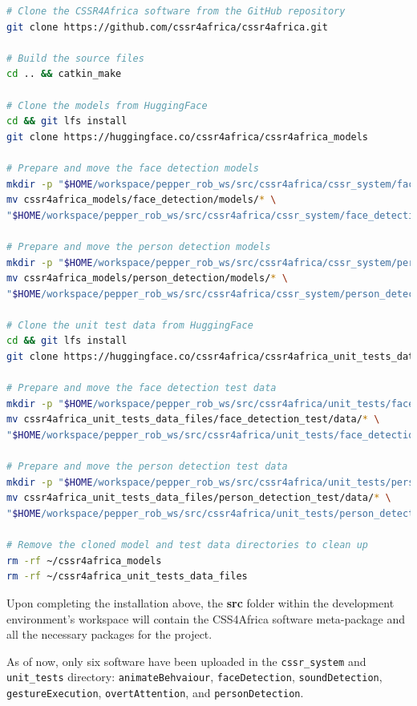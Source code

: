 \documentclass{CSSRforAfrica}
\begin{document}
{\begin{lstlisting}[style=withoutNumbering, language=bash]
# Clone the CSSR4Africa software from the GitHub repository
git clone https://github.com/cssr4africa/cssr4africa.git

# Build the source files
cd .. && catkin_make

# Clone the models from HuggingFace
cd && git lfs install
git clone https://huggingface.co/cssr4africa/cssr4africa_models

# Prepare and move the face detection models
mkdir -p "$HOME/workspace/pepper_rob_ws/src/cssr4africa/cssr_system/face_detection/models"
mv cssr4africa_models/face_detection/models/* \
"$HOME/workspace/pepper_rob_ws/src/cssr4africa/cssr_system/face_detection/models/"

# Prepare and move the person detection models
mkdir -p "$HOME/workspace/pepper_rob_ws/src/cssr4africa/cssr_system/person_detection/models"
mv cssr4africa_models/person_detection/models/* \
"$HOME/workspace/pepper_rob_ws/src/cssr4africa/cssr_system/person_detection/models/"

# Clone the unit test data from HuggingFace
cd && git lfs install
git clone https://huggingface.co/cssr4africa/cssr4africa_unit_tests_data_files

# Prepare and move the face detection test data
mkdir -p "$HOME/workspace/pepper_rob_ws/src/cssr4africa/unit_tests/face_detection_test/data"
mv cssr4africa_unit_tests_data_files/face_detection_test/data/* \
"$HOME/workspace/pepper_rob_ws/src/cssr4africa/unit_tests/face_detection_test/data/"

# Prepare and move the person detection test data
mkdir -p "$HOME/workspace/pepper_rob_ws/src/cssr4africa/unit_tests/person_detection_test/data"
mv cssr4africa_unit_tests_data_files/person_detection_test/data/* \
"$HOME/workspace/pepper_rob_ws/src/cssr4africa/unit_tests/person_detection_test/data/"

# Remove the cloned model and test data directories to clean up
rm -rf ~/cssr4africa_models
rm -rf ~/cssr4africa_unit_tests_data_files
\end{lstlisting}

\noindent Upon completing the installation above, the \textbf{src} folder within the development environment's workspace will contain the CSS4Africa software meta-package and all the necessary packages for the project. 

\newpage

As of now, only six software have been uploaded in the \texttt{cssr\_system} and \texttt{unit\_tests} directory: \texttt{animateBehvaiour}, \texttt{faceDetection}, \texttt{soundDetection}, \texttt{gestureExecution}, \texttt{overtAttention}, $ $and \texttt{personDetection}. 

}
\end{document}
